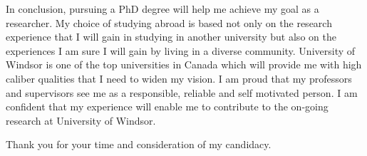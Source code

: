 \documentclass[10pt]{article}%
\begin{document}
  	In conclusion, pursuing a PhD degree will help me achieve my goal as a researcher. My choice of studying abroad is based not only on the research experience that I will gain in  studying in another university but also on the experiences I am sure I will gain by living in a diverse community. University of Windsor is one of the top universities in Canada which will provide me with high caliber qualities that I need to widen my vision. I am proud that my professors and supervisors see me as a responsible, reliable and self motivated person. I am confident that my experience will enable me to contribute to the on-going research at University of Windsor.


\noindent Thank you for your time and consideration of my candidacy.
\end{document}
